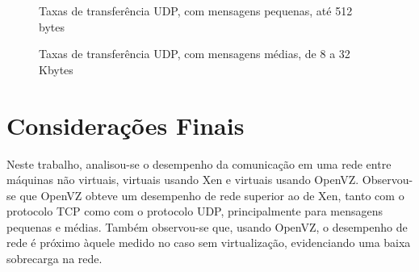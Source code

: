 \documentclass[12pt]{article}
\begin{document}
\begin{figure}[!htb]
\centering
{}
\caption{Taxas de transferência UDP, com mensagens  pequenas, até 512 bytes}
\label{fig:udp_peq}
\end{figure}

\begin{figure}[!htb]
\centering
{}
\caption{Taxas de transferência UDP, com mensagens médias, de 8 a 32 Kbytes}
\label{fig:udp_med}
\end{figure}

\section{Considerações Finais}\label{s:fim}

Neste trabalho, analisou-se o desempenho da comunicação em uma rede entre máquinas não virtuais, virtuais usando Xen e virtuais usando OpenVZ. Observou-se que OpenVZ obteve um desempenho de rede superior ao de Xen, tanto com o protocolo TCP como com o protocolo UDP, principalmente para mensagens pequenas e médias. Também observou-se que, usando OpenVZ, o desempenho de rede é próximo àquele medido no caso sem virtualização, evidenciando uma baixa sobrecarga na rede.
\end{document}
